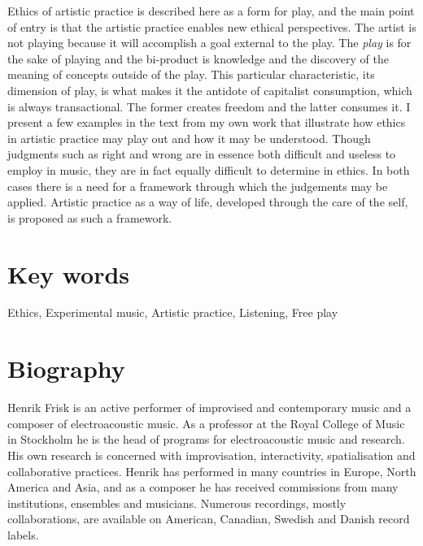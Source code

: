 \documentclass[11pt]{article}
\begin{document}
Ethics of artistic practice is described here as a form for play, and the main point of entry is that the artistic practice enables new ethical perspectives. The artist is not playing because it will accomplish a goal external to the play. The \emph{play} is for the sake of playing and the bi-product is knowledge and the discovery of the meaning of concepts outside of the play. This particular characteristic, its dimension of play, is what makes it the antidote of capitalist consumption, which is always transactional. The former creates freedom and the latter consumes it. I present a few examples in the text from my own work that illustrate how ethics in artistic practice may play out and how it may be understood. Though judgments such as right and wrong are in essence both difficult and useless to employ in music, they are in fact equally difficult to determine in ethics. In both cases there is a need for a framework through which the judgements may be applied. Artistic practice as a way of life, developed through the care of the self, is proposed as such a framework.
\section*{Key words}
\label{sec:org955e940}
Ethics, Experimental music, Artistic practice, Listening, Free play
\section*{Biography}
\label{sec:org4544cc7}
Henrik Frisk is an active performer of improvised and contemporary music and a composer of electroacoustic music. As a professor at the Royal College of Music in Stockholm he is the head of programs for electroacoustic music and research. His own research is concerned with improvisation, interactivity, spatialisation and collaborative practices. Henrik has performed in many countries in Europe, North America and Asia, and as a composer he has received commissions from many institutions, ensembles and musicians. Numerous recordings, mostly collaborations, are available on American, Canadian, Swedish and Danish record labels.
\end{document}
